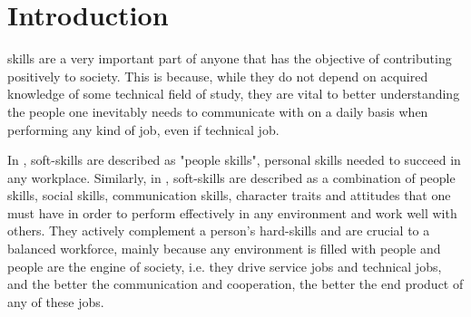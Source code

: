 \documentclass[a4paper,12pt,journal,twoside,compsoc]{PPIEEEtran}
\begin{document}


\maketitle

\IEEEdisplaynontitleabstractindextext
\IEEEpeerreviewmaketitle
\section{Introduction}
% 
% 
 skills are a very important part of anyone that has the objective of contributing positively to society. This is because, while they do not depend on acquired knowledge of some technical field of study, they are vital to better understanding the people one inevitably needs to communicate with on a daily basis when performing any kind of job, even if technical job.

In \cite{balance}, soft-skills are described as "people skills", personal skills needed to succeed in any workplace. Similarly, in \cite{workforce}, soft-skills are described as a combination of people skills, social skills, communication skills, character traits and attitudes that one must have in order to perform effectively in any environment and work well with others. They actively complement a person's hard-skills and are crucial to a balanced workforce, mainly because any environment is filled with people and people are the engine of society, i.e. they drive service jobs and technical jobs, and the better the communication and cooperation, the better the end product of any of these jobs.
\end{document}
